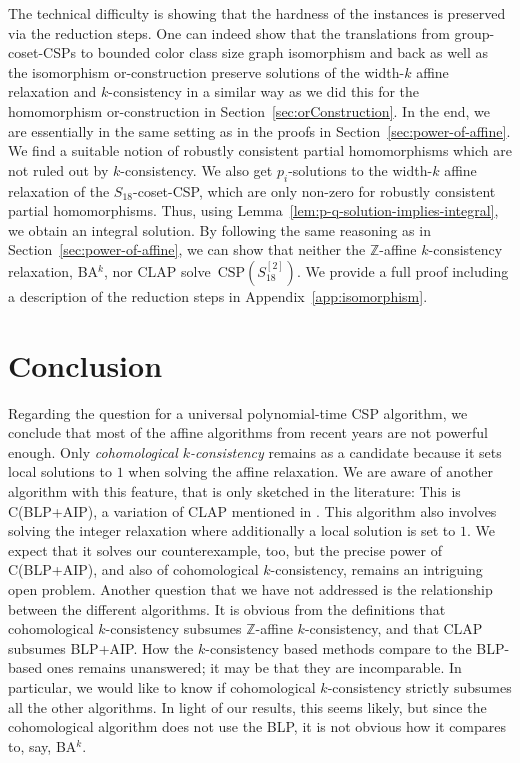 \documentclass[a4paper,english, thm-restate]{lipics-v2021}
\newcommand{\ZZ}{\mathbb{Z}}
\newcommand{\CSP}[1]{\mathrm{CSP}(#1)}
\newcommand{\bbZ}{\mathbb{Z}}
\newcommand{\CosetGrpTmplt}[2]{#1^{[#2]}}
\newcommand{\Sym}[1]{S_{#1}}
\begin{document}
	The technical difficulty is showing that the hardness of the instances
	is preserved via the reduction steps.
	One can indeed show that the translations from group-coset-CSPs to bounded color class size graph isomorphism and back  as well as the isomorphism or-construction
	preserve solutions of the width-$k$ affine relaxation and $k$-consistency
	in a similar way as we did this for the homomorphism or-construction in Section~\ref{sec:orConstruction}.
In the end, we are essentially in the same setting as in the proofs in Section~\ref{sec:power-of-affine}. We find a suitable notion of robustly consistent partial homomorphisms which are not ruled out by $k$-consistency.
	We also get $p_i$-solutions to the width-$k$ affine relaxation of the $\Sym{18}$-coset-CSP,
	which are only non-zero for robustly consistent partial homomorphisms.
	Thus, using Lemma~\ref{lem:p-q-solution-implies-integral},
	we obtain an integral solution.
	By following the same reasoning as in Section~\ref{sec:power-of-affine},
	we can show that neither the $\ZZ$-affine $k$-consistency relaxation, BA$^k$,
	nor CLAP solve~$\CSP{\CosetGrpTmplt{\Sym{18}}{2}}$.
	We provide a full proof including a description of the reduction steps in Appendix~\ref{app:isomorphism}.
	
	\section{Conclusion}
	Regarding the question for a universal polynomial-time CSP algorithm, we conclude that most of the affine algorithms from recent years are not powerful enough. 
	Only \emph{cohomological $k$\nobreakdash-consistency} remains as a candidate because it sets local solutions to $1$ when solving the affine relaxation.
	We are aware of another algorithm with this feature, that is only sketched in the literature: This is C(BLP+AIP), a variation of CLAP mentioned in \cite{CiardoZivny2023CLAP}. This algorithm also involves solving the integer relaxation where additionally a local solution is set to $1$. We expect that it solves our counterexample, too, but the precise power of C(BLP+AIP), and also of cohomological $k$\nobreakdash-consistency, remains an intriguing open problem.
	Another question that we have not addressed is the relationship between the different algorithms. It is obvious from the definitions that cohomological $k$-consistency subsumes $\bbZ$-affine $k$-consistency, and that CLAP subsumes BLP+AIP. How the $k$\nobreakdash-consistency based methods compare to the BLP-based ones remains unanswered; it may be that they are incomparable. In particular, we would like to know if cohomological $k$-consistency strictly subsumes all the other algorithms. In light of our results, this seems likely, but since the cohomological algorithm does not use the BLP, it is not obvious how it compares to, say, BA$^{k}$.
	
\end{document}
